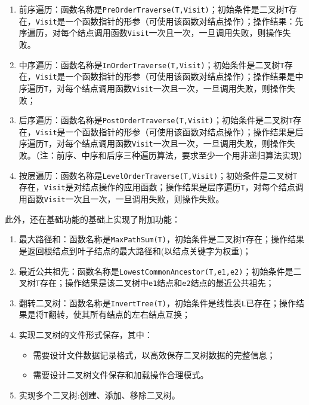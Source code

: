 \documentclass[supercite]{Experimental_Report}
\theoremstyle{definition}
\begin{document}
\begin{enumerate}
	\item 前序遍历：函数名称是\verb|PreOrderTraverse(T,Visit)|；初始条件是二叉树\verb|T|存在，\verb|Visit|是一个函数指针的形参（可使用该函数对结点操作）；操作结果：先序遍历，对每个结点调用函数\verb|Visit|一次且一次，一旦调用失败，则操作失败。
	\item 中序遍历：函数名称是\verb|InOrderTraverse(T,Visit)|；初始条件是二叉树\verb|T|存在，\verb|Visit|是一个函数指针的形参（可使用该函数对结点操作）；操作结果是中序遍历\verb|T|，对每个结点调用函数\verb|Visit|一次且一次，一旦调用失败，则操作失败；
	\item 后序遍历：函数名称是\verb|PostOrderTraverse(T,Visit)|；初始条件是二叉树\verb|T|存在，\verb|Visit|是一个函数指针的形参（可使用该函数对结点操作）；操作结果是后序遍历\verb|T|，对每个结点调用函数\verb|Visit|一次且一次，一旦调用失败，则操作失败。（注：前序、中序和后序三种遍历算法，要求至少一个用非递归算法实现）
	\item 按层遍历：函数名称是\verb|LevelOrderTraverse(T,Visit)|；初始条件是二叉树\verb|T|存在，\verb|Visit|是对结点操作的应用函数；操作结果是层序遍历\verb|T|，对每个结点调用函数\verb|Visit|一次且一次，一旦调用失败，则操作失败。
\end{enumerate}
此外，还在基础功能的基础上实现了附加功能：
\begin{enumerate}
	\item 最大路径和：函数名称是\verb|MaxPathSum(T)|，初始条件是二叉树\verb|T|存在；操作结果是返回根结点到叶子结点的最大路径和(以结点关键字为权重)；
	\item 最近公共祖先：函数名称是\verb|LowestCommonAncestor(T,e1,e2)|；初始条件是二叉树\verb|T|存在；操作结果是该二叉树中\verb|e1|结点和\verb|e2|结点的最近公共祖先；
	\item 翻转二叉树：函数名称是\verb|InvertTree(T)|，初始条件是线性表\verb|L|已存在；操作结果是将\verb|T|翻转，使其所有结点的左右结点互换；
	\item 实现二叉树的文件形式保存，其中：
	\begin{itemize}
		\item 需要设计文件数据记录格式，以高效保存二叉树数据的完整信息；
		\item 需要设计二叉树文件保存和加载操作合理模式。
	\end{itemize}	
	\item 实现多个二叉树:创建、添加、移除二叉树。
\end{enumerate}
\end{document}
